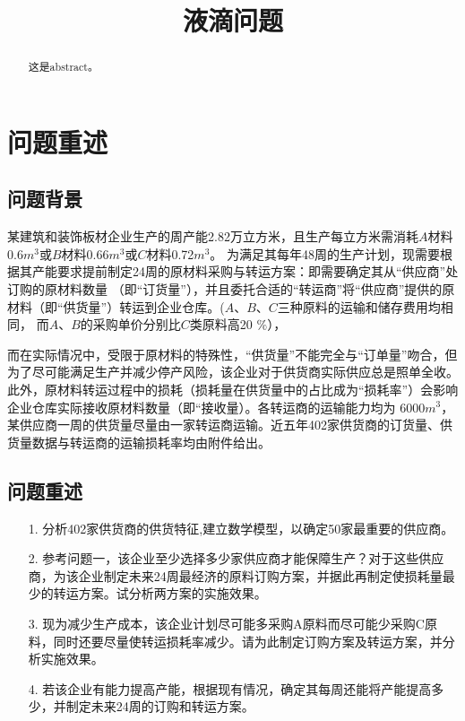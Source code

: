 \documentclass{cumcmthesis}
\title{液滴问题}\tihao{A}
\begin{document}
\maketitle

\begin{abstract}
    这是abstract。

\end{abstract}

\section{问题重述}
\subsection{问题背景}
某建筑和装饰板材企业生产的周产能2.82万立方米，且生产每立方米需消耗$A$材料0.6$m^{3}$或$B$材料0.66$m^{3}$或$C$材料0.72$m^{3}$。
为满足其每年48周的生产计划，现需要根据其产能要求提前制定24周的原材料采购与转运方案：即需要确定其从“供应商”处订购的原材料数量
（即“订货量”），并且委托合适的“转运商”将“供应商”提供的原材料（即“供货量”）转运到企业仓库。($A$、$B$、$C$三种原料的运输和储存费用均相同，
而$A$、$B$的采购单价分别比$C$类原料高20 $\%$），\par
而在实际情况中，受限于原材料的特殊性，“供货量”不能完全与“订单量”吻合，但为了尽可能满足生产并减少停产风险，该企业对于供货商实际供应总是照单全收。
此外，原材料转运过程中的损耗（损耗量在供货量中的占比成为“损耗率”）会影响企业仓库实际接收原材料数量（即“接收量）。各转运商的运输能力均为
6000$m^{3}$，某供应商一周的供货量尽量由一家转运商运输。近五年402家供货商的订货量、供货量数据与转运商的运输损耗率均由附件给出。\par
\subsection{问题重述}
\begin{enumerate}
    \item [1.] 分析402家供货商的供货特征,建立数学模型，以确定50家最重要的供应商。
    \item [2.] 参考问题一，该企业至少选择多少家供应商才能保障生产？对于这些供应商，为该企业制定未来24周最经济的原料订购方案，并据此再制定使损耗量最少的转运方案。试分析两方案的实施效果。
    \item [3.] 现为减少生产成本，该企业计划尽可能多采购A原料而尽可能少采购C原料，同时还要尽量使转运损耗率减少。请为此制定订购方案及转运方案，并分析实施效果。
    \item [4.] 若该企业有能力提高产能，根据现有情况，确定其每周还能将产能提高多少，并制定未来24周的订购和转运方案。
    \end{enumerate}
    
\end{document}
